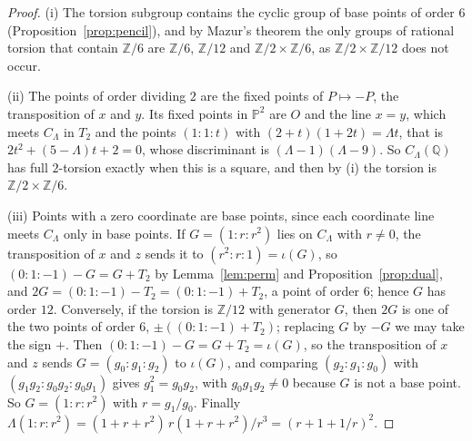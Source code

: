 \documentclass[10pt]{article}
\newcommand{\Q}{\mathbb{Q}}
\newcommand{\Z}{\mathbb{Z}}
\newcommand{\PP}{\mathbb{P}}
\begin{document}
\begin{proof}
(i) The torsion subgroup contains the cyclic group of base points of order $6$ (Proposition~\ref{prop:pencil}), and by Mazur's theorem \cite[Chapter~III, Theorem~(5.1), p.~156]{mazur1977} the only groups of rational torsion that contain $\Z/6$ are $\Z/6$, $\Z/12$ and $\Z/2\times\Z/6$, as $\Z/2\times\Z/12$ does not occur.

(ii) The points of order dividing $2$ are the fixed points of $P\mapsto-P$, the transposition of $x$ and $y$. Its fixed points in $\PP^2$ are $O$ and the line $x=y$, which meets $C_\Lambda$ in $T_2$ and the points $(1:1:t)$ with $(2+t)(1+2t)=\Lambda t$, that is $2t^2+(5-\Lambda)t+2=0$, whose discriminant is $(\Lambda-1)(\Lambda-9)$. So $C_\Lambda(\Q)$ has full $2$-torsion exactly when this is a square, and then by (i) the torsion is $\Z/2\times\Z/6$.

(iii) Points with a zero coordinate are base points, since each coordinate line meets $C_\Lambda$ only in base points. If $G=(1:r:r^2)$ lies on $C_\Lambda$ with $r\ne0$, the transposition of $x$ and $z$ sends it to $(r^2:r:1)=\iota(G)$, so $(0:1:-1)-G=G+T_2$ by Lemma~\ref{lem:perm} and Proposition~\ref{prop:dual}, and $2G=(0:1:-1)-T_2=(0:1:-1)+T_2$, a point of order $6$; hence $G$ has order $12$. Conversely, if the torsion is $\Z/12$ with generator $G$, then $2G$ is one of the two points of order $6$, $\pm((0:1:-1)+T_2)$; replacing $G$ by $-G$ we may take the sign $+$. Then $(0:1:-1)-G=G+T_2=\iota(G)$, so the transposition of $x$ and $z$ sends $G=(g_0:g_1:g_2)$ to $\iota(G)$, and comparing $(g_2:g_1:g_0)$ with $(g_1g_2:g_0g_2:g_0g_1)$ gives $g_1^2=g_0g_2$, with $g_0g_1g_2\ne0$ because $G$ is not a base point. So $G=(1:r:r^2)$ with $r=g_1/g_0$. Finally $\Lambda(1:r:r^2)=(1+r+r^2)\,r(1+r+r^2)/r^3=(r+1+1/r)^2$.


\end{proof}
\end{document}
